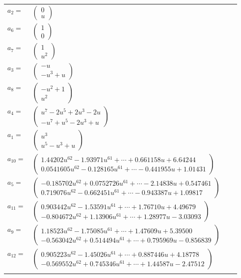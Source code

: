 \documentclass[1p]{elsarticle_modified}
\theoremstyle{definition}
\begin{document}
\begin{tabular}{m{7pt} m{180pt} m{7pt} m{180pt} }
\flushright $a_{2}=$&$\begin{pmatrix}0\\u\end{pmatrix}$ \\
\flushright $a_{6}=$&$\begin{pmatrix}1\\0\end{pmatrix}$ \\
\flushright $a_{7}=$&$\begin{pmatrix}1\\u^2\end{pmatrix}$ \\
\flushright $a_{3}=$&$\begin{pmatrix}- u\\- u^3+u\end{pmatrix}$ \\
\flushright $a_{8}=$&$\begin{pmatrix}- u^2+1\\u^2\end{pmatrix}$ \\
\flushright $a_{4}=$&$\begin{pmatrix}u^7-2 u^5+2 u^3-2 u\\- u^7+u^5-2 u^3+u\end{pmatrix}$ \\
\flushright $a_{1}=$&$\begin{pmatrix}u^3\\u^5- u^3+u\end{pmatrix}$ \\
\flushright $a_{10}=$&$\begin{pmatrix}1.44202 u^{62}-1.93971 u^{61}+\cdots+0.661158 u+6.64244\\0.0541605 u^{62}-0.128165 u^{61}+\cdots-0.441955 u+1.01431\end{pmatrix}$ \\
\flushright $a_{5}=$&$\begin{pmatrix}-0.185702 u^{62}+0.0752726 u^{61}+\cdots-2.14838 u+0.547461\\0.719076 u^{62}-0.662451 u^{61}+\cdots-0.943387 u+1.09817\end{pmatrix}$ \\
\flushright $a_{11}=$&$\begin{pmatrix}0.903442 u^{62}-1.53591 u^{61}+\cdots+1.76710 u+4.49679\\-0.804672 u^{62}+1.13906 u^{61}+\cdots+1.28977 u-3.03093\end{pmatrix}$ \\
\flushright $a_{9}=$&$\begin{pmatrix}1.18523 u^{62}-1.75085 u^{61}+\cdots+1.47609 u+5.39500\\-0.563042 u^{62}+0.514494 u^{61}+\cdots+0.795969 u-0.856839\end{pmatrix}$ \\
\flushright $a_{12}=$&$\begin{pmatrix}0.905223 u^{62}-1.45026 u^{61}+\cdots+0.887446 u+4.18778\\-0.569552 u^{62}+0.745346 u^{61}+\cdots+1.44587 u-2.47512\end{pmatrix}$\\&\end{tabular}
\end{document}
